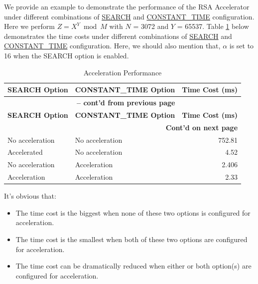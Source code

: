 \documentclass[main\_\_EN.tex]{subfiles}
\begin{document}
We provide an example to demonstrate the performance of the RSA Accelerator under different combinations of \hyperref[regdesc:RSASEARCHENABLEREG]{SEARCH} and \hyperref[regdesc:RSACONSTANTTIMEREG]{CONSTANT\_TIME} configuration. Here we perform \begin{math}Z = X^{Y} \bmod M\end{math} with \begin{math}N\end{math} = 3072 and \begin{math}Y\end{math} = 65537. Table \ref{tab:accelerationeffect} below demonstrates the time costs under different combinations of \hyperref[regdesc:RSASEARCHENABLEREG]{SEARCH} and \hyperref[regdesc:RSACONSTANTTIMEREG]{CONSTANT\_TIME} configuration. Here, we should also mention that, \begin{math} \alpha \end{math} is set to 16 when the SEARCH option is enabled.

\begin{longtable}{ | l | l | r | }
    \caption{Acceleration Performance}\label{tab:accelerationeffect}
    \\\hline
    \rowcolor{lightgray}
        \textbf{SEARCH Option} & \textbf{CONSTANT\_TIME Option} & \textbf{Time Cost (ms)}  \\ \hline
        \endfirsthead
        \multicolumn{3}{c}{\bfseries \tablename\ \thetable{} -- cont'd from previous page}\\\hline

        \rowcolor{lightgray}
        \textbf{SEARCH Option} & \textbf{CONSTANT\_TIME Option} & \textbf{Time Cost (ms)}  \\ \hline
        \endhead

        \multicolumn{3}{r}{\textbf{Cont'd on next page}} \\
        \endfoot
        \endlastfoot
        \hline
    No acceleration & No acceleration & 752.81   \\ \hline
    Accelerated & No acceleration & 4.52     \\ \hline
    No acceleration & Acceleration & 2.406     \\ \hline
    Acceleration & Acceleration & 2.33     \\ \hline
\end{longtable}

It's obvious that:
\begin{itemize}
    \item The time cost is the biggest when none of these two options is configured for acceleration.
    \item The time cost is the smallest when both of these two options are configured for acceleration.
    \item The time cost can be dramatically reduced when either or both option(s) are configured for acceleration.
\end{itemize}
\end{document}
